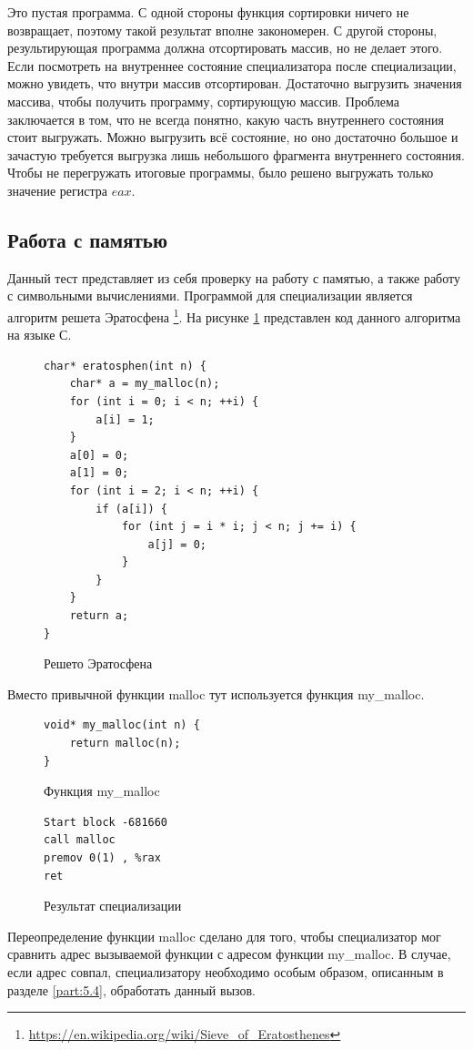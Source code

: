 Это пустая программа. С одной стороны функция сортировки ничего не возвращает, поэтому такой результат вполне закономерен. С другой стороны, результирующая программа должна отсортировать массив, но не делает этого. Если посмотреть на внутреннее состояние специализатора после специализации, можно увидеть, что внутри массив отсортирован. Достаточно выгрузить значения массива, чтобы получить программу, сортирующую массив. Проблема заключается в том, что не всегда понятно, какую часть внутреннего состояния стоит выгружать. Можно выгрузить всё состояние, но оно достаточно большое и зачастую требуется выгрузка лишь небольшого фрагмента внутреннего состояния. Чтобы не перегружать итоговые программы, было решено выгружать только значение регистра $eax$.

\subsection{ Работа с памятью}

Данный тест представляет из себя проверку на работу с памятью, а также работу с символьными вычислениями. Программой для специализации является алгоритм решета Эратосфена \footnote{\url{https://en.wikipedia.org/wiki/Sieve_of_Eratosthenes}}. На рисунке \ref{fig:era} представлен код данного алгоритма на языке С.
\begin{figure}[h]
\begin{lstlisting}[xleftmargin = 20pt]
char* eratosphen(int n) {
    char* a = my_malloc(n);
    for (int i = 0; i < n; ++i) {
        a[i] = 1;
    }
    a[0] = 0;
    a[1] = 0;
    for (int i = 2; i < n; ++i) {
        if (a[i]) {
            for (int j = i * i; j < n; j += i) {
                a[j] = 0;
            }
        }
    }
    return a;
}
\end{lstlisting}
\caption{ Решето Эратосфена}
\label{fig:era}
\end{figure}
Вместо привычной функции malloc тут используется функция my\_malloc.
\begin{figure}
\begin{lstlisting}[xleftmargin = 20pt]
void* my_malloc(int n) {
    return malloc(n);
}
\end{lstlisting}
\caption{ Функция my\_malloc}
\end{figure}
\begin{figure}
\begin{lstlisting}[xleftmargin = 20pt]
Start block -681660
call malloc
premov 0(1) , %rax 
ret
\end{lstlisting}
\caption{Результат специализации}
\label{fig:erares}
\end{figure}
Переопределение функции malloc сделано для того, чтобы специализатор мог сравнить адрес вызываемой функции с адресом функции my\_malloc. В случае, если адрес совпал, специализатору необходимо особым образом, описанным в разделе \ref{part:5.4}, обработать данный вызов.


